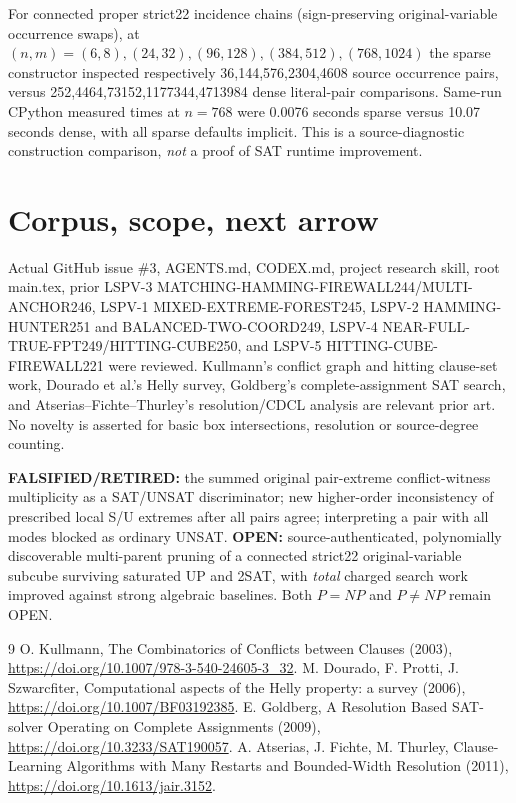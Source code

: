 \documentclass[11pt]{article}
\begin{document}
For connected proper strict22 incidence chains (sign-preserving original-variable occurrence swaps), at $(n,m)=(6,8),(24,32),(96,128),(384,512),(768,1024)$ the sparse constructor inspected respectively 36,144,576,2304,4608 source occurrence pairs, versus 252,4464,73152,1177344,4713984 dense literal-pair comparisons. Same-run CPython measured times at $n=768$ were 0.0076 seconds sparse versus 10.07 seconds dense, with all sparse defaults implicit. This is a source-diagnostic construction comparison, \emph{not} a proof of SAT runtime improvement.

\section{Corpus, scope, next arrow}
Actual GitHub issue \#3, AGENTS.md, CODEX.md, project research skill, root main.tex, prior LSPV-3 MATCHING-HAMMING-FIREWALL244/MULTI-ANCHOR246, LSPV-1 MIXED-EXTREME-FOREST245, LSPV-2 HAMMING-HUNTER251 and BALANCED-TWO-COORD249, LSPV-4 NEAR-FULL-TRUE-FPT249/HITTING-CUBE250, and LSPV-5 HITTING-CUBE-FIREWALL221 were reviewed. Kullmann's conflict graph and hitting clause-set work, Dourado et al.'s Helly survey, Goldberg's complete-assignment SAT search, and Atserias--Fichte--Thurley's resolution/CDCL analysis are relevant prior art. No novelty is asserted for basic box intersections, resolution or source-degree counting.

\noindent \textbf{FALSIFIED/RETIRED:} the summed original pair-extreme conflict-witness multiplicity as a SAT/UNSAT discriminator; new higher-order inconsistency of prescribed local S/U extremes after all pairs agree; interpreting a pair with all modes blocked as ordinary UNSAT. \textbf{OPEN:} source-authenticated, polynomially discoverable multi-parent pruning of a connected strict22 original-variable subcube surviving saturated UP and 2SAT, with \emph{total} charged search work improved against strong algebraic baselines. Both $P=NP$ and $P\ne NP$ remain OPEN.

\begin{thebibliography}{9}
 O. Kullmann, The Combinatorics of Conflicts between Clauses (2003), \url{https://doi.org/10.1007/978-3-540-24605-3_32}.
 M. Dourado, F. Protti, J. Szwarcfiter, Computational aspects of the Helly property: a survey (2006), \url{https://doi.org/10.1007/BF03192385}.
 E. Goldberg, A Resolution Based SAT-solver Operating on Complete Assignments (2009), \url{https://doi.org/10.3233/SAT190057}.
 A. Atserias, J. Fichte, M. Thurley, Clause-Learning Algorithms with Many Restarts and Bounded-Width Resolution (2011), \url{https://doi.org/10.1613/jair.3152}.
\end{thebibliography}
\end{document}
